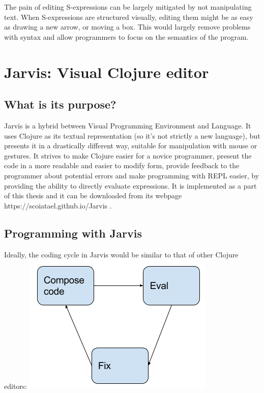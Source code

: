 \documentclass[11pt]{scrartcl}
\begin{document}
The pain of editing S-expressions can be largely mitigated by not manipulating text. When S-expressions are structured visually, editing them might be as easy as drawing a new arrow, or moving a box. This would largely remove problems with syntax and allow programmers to focus on the semantics of the program.

\section{Jarvis: Visual Clojure editor}
\subsection{What is its purpose?}
Jarvis is a hybrid between Visual Programming Environment and Language. It uses Clojure as its textual representation (so it’s not strictly a new language), but presents it in a drastically different way, suitable for manipulation with mouse or gestures. It strives to make Clojure easier for a novice programmer, present the code in a more readable and easier to modify form, provide feedback to the programmer about potential errors and make programming with REPL easier, by providing the ability to directly evaluate expressions. It is implemented as a part of this thesis and it can be downloaded from its webpage {https://scoiatael.github.io/Jarvis }.
\subsection{Programming with Jarvis}
Ideally, the coding cycle in Jarvis would be similar to that of other Clojure editors:
\includegraphics[scale=0.5]{img/Programming.png}
\end{document}
